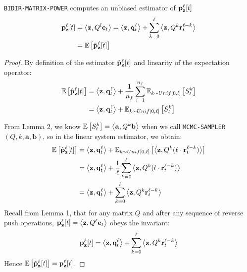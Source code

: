\begin{lemma}
\texttt{BIDIR-MATRIX-POWER} computes an unbiased estimator of ${\mathbf{p}}_\mathbf{z}^{\ell}[t]$
\begin{align*}
{\mathbf{p}}_\mathbf{z}^{\ell}[t] &=  \left<\mathbf{z}, Q^l \mathbf{e}_t \right>= \left<\mathbf{z}, \mathbf{q}_t^{\ell} \right> + \sum_{k=0}^{\ell} \left<\mathbf{z} , Q^k\mathbf{r}_t^{\ell-k}\right>\\
&= \mathbb{E}\left[\hat{\mathbf{p}}_{\mathbf{z}}^{\ell}[t] \right]
\end{align*}
\end{lemma}

\begin{proof}
By definition of the estimator $\hat{\mathbf{p}}_\mathbf{z}^{\ell}[t]$ and linearity of the expectation operator:
\begin{align*}
\mathbb{E}\left[\hat{\mathbf{p}}_\mathbf{z}^{\ell}[t]\right] &= \left<\mathbf{z}, \mathbf{q}_t^{\ell} \right> + \frac{1}{n_f}\sum_{i=1}^{n_f} \mathbb{E}_{k \sim Unif[0, l]}\left[S_{t}^{k}\right] \\
&= \left<\mathbf{z}, \mathbf{q}_t^{\ell} \right> + \mathbb{E}_{k \sim Unif[0, \ell]}\left[S_{t}^{k}\right]
\end{align*}

From Lemma 2, we know $\mathbb{E}\left[S_{t}^{k}\right] = \left< \mathbf{a}, Q^k \mathbf{b} \right>$ when we call \texttt{MCMC-SAMPLER}$(Q, k, \mathbf{a}, \mathbf{b})$, so in the linear system estimator, we obtain: 
\begin{align*}
\mathbb{E}\left[\hat{\mathbf{p}}_\mathbf{z}^{\ell}[t] \right] &= \left<\mathbf{z}, \mathbf{q}_t^{\ell} \right> + \mathbb{E}_{k \sim Unif[0, \ell]} \left[\left< \mathbf{z}, Q^k ( \ell \cdot \mathbf{r}_t^{\ell-k}) \right> \right] \\
&= \left<\mathbf{z}, \mathbf{q}_t^{\ell} \right> + \frac{1}{\ell} \sum_{k = 0}^\ell\left< \mathbf{z}, Q^k ( l \cdot \mathbf{r}_t^{\ell-k} ) \right>\\
&= \left<\mathbf{z}, \mathbf{q}_t^{\ell} \right> + \sum_{k = 0}^l\left< \mathbf{z}, Q^k\mathbf{r}_t^{\ell-k} \right>
\end{align*}
Recall from Lemma 1, that for any matrix $Q$ and after any sequence of reverse push operations, $\mathbf{p}_{\mathbf{z}}^{\ell}[t] = \left<\mathbf{z}, Q^{\ell} \mathbf{e}_t \right>$ obeys the invariant: 
$${\mathbf{p}}_\mathbf{z}^{\ell}[t] = \left<\mathbf{z}, \mathbf{q}_t^{\ell} \right> + \sum_{k=0}^{\ell} \left<\mathbf{z}, Q^k\mathbf{r}_t^{\ell-k}\right>$$
Hence $\mathbb{E}\left[\hat{\mathbf{p}}_\mathbf{z}^{\ell}[t] \right] = {\mathbf{p}}_\mathbf{z}^{\ell}[t]$.
\end{proof}


